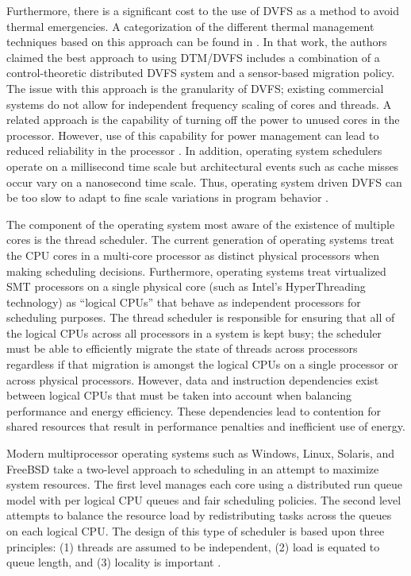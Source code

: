 Furthermore, there is a significant cost to the use of DVFS as a method
to avoid thermal emergencies.  A categorization of the different thermal
management techniques based on this approach can be found in
\cite{Donald2006}.  In that work, the authors claimed the best approach
to using DTM/DVFS includes a combination of a control-theoretic
distributed DVFS system and a sensor-based migration policy.  The issue
with this approach is the granularity of DVFS; existing commercial
systems do not allow for independent frequency scaling of cores and
threads.  A related approach is the capability of turning off the power
to unused cores in the processor.  However, use of this capability for
power management can lead to reduced reliability in the processor
\cite{Rosing2007,Coskun2008d}.   In addition, operating system
schedulers operate on a millisecond time scale but architectural events
such as cache misses occur vary on a nanosecond time scale.  Thus,
operating system driven DVFS can be too slow to adapt to fine scale
variations in program behavior \cite{Rangan2009}.

The component of the operating system most aware of the existence of
multiple cores is the thread scheduler. The current generation of
operating systems treat the CPU cores in a multi-core processor as
distinct physical processors when making scheduling
decisions. Furthermore, operating systems treat virtualized SMT
processors on a single physical core (such as Intel's HyperThreading
technology) as ``logical CPUs'' that behave as independent processors
for scheduling purposes. The thread scheduler is responsible for
ensuring that all of the logical CPUs across all processors in a system
is kept busy; the scheduler must be able to efficiently migrate the
state of threads across processors regardless if that migration is
amongst the logical CPUs on a single processor or across physical
processors.  However, data and instruction dependencies exist between
logical CPUs that must be taken into account when balancing performance
and energy efficiency.  These dependencies lead to contention for shared
resources that result in performance penalties and inefficient use of
energy.

Modern multiprocessor operating systems such as Windows, Linux, Solaris,
and FreeBSD take a two-level approach to scheduling in an attempt to
maximize system resources.  The first level manages each core using a
distributed run queue model with per logical CPU queues and fair
scheduling policies. The second level attempts to balance the resource
load by redistributing tasks across the queues on each logical CPU.  The
design of this type of scheduler is based upon three principles: (1)
threads are assumed to be independent, (2) load is equated to queue
length, and (3) locality is important \cite{Hofmeyr2010}.

